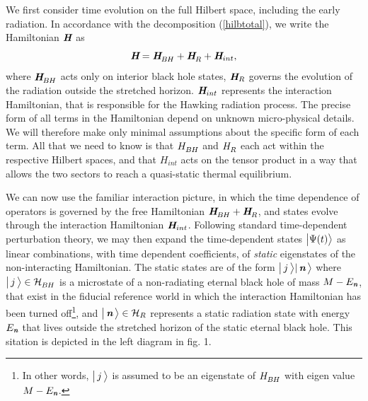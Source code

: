 \documentclass[12pt]{article}%
\def\be{\begin{equation}}
\def\ee{\end{equation}}
\begin{document}
We  first consider time evolution on the full Hilbert space, including the early radiation. 
In accordance with the decomposition (\ref{hilbtotal}), we write the Hamiltonian $\textit{\textbf H}$ as 
\be
\hH= \hH_\BH + \hH_\R+ \hH_{int}, 
\ee
where $\hH_\BH$ acts only on interior black hole states, $\textit{\textbf H}_R$ governs the evolution of the radiation outside the stretched horizon. $\textit{\textbf H}_{int}$ represents the interaction Hamiltonian, that is responsible for the Hawking radiation process. 
The precise form of  all terms in the Hamiltonian depend on unknown  micro-physical details.
We will therefore make only minimal assumptions about the specific form of each term. All that we need to know is that $H_\BH$ and $H_\R$ each act within the respective Hilbert spaces, and that $H_{int}$ acts on the tensor product in a way that
allows the two sectors to reach a quasi-static thermal equilibrium.

We can now use the familiar interaction picture, in which the time dependence of operators is governed by the free Hamiltonian
 $\hH_\BH+ \hH_\R$, and states evolve through the interaction Hamiltonian $\textit{\textbf H}_{int}$.  Following standard time-dependent perturbation
 theory, we may then expand the time-dependent states $\bigl|\Psi(t)\bigr\rangle$  as linear combinations, with  time dependent coefficients, of {\it static} eigenstates of the non-interacting Hamiltonian. The static states are of the form $\bigl| \, j \, \bigr\rangle |\, { \textit{\textbf n}} \, \bigr\rangle$ where
 $\bigl|\, j \, \ra  \in {\cal H}_\BH$ is a microstate of a non-radiating eternal black hole of mass $M-E_{{ \textit{\textbf n}}}$, 
 that exist in the fiducial reference world in which the interaction Hamiltonian has been turned off\footnote{In other words, $\bigl|\, j \, \bigr\rangle$ is assumed to be an eigenstate of $H_\BH$ with eigen value $M-E_{ \textit{\textbf n}}$.}, and $\bigl|\, \nom \, \ra \in {\cal H}_R$ represents a static radiation state with energy $E_{ \textit{\textbf n}}$ that lives
 outside the stretched horizon of the static eternal black hole. This sitation is depicted in the left diagram in fig. 1.
 
\end{document}
